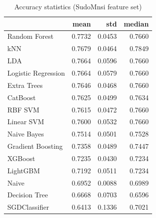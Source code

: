 \begin{table}
\caption{Accuracy statistics (SudoMnsi feature set)}
\label{tab:accuracy_SudoMnsi_stats}
\begin{tabular}{lrrr}
\toprule
 & mean & std & median \\
\midrule
Random Forest & 0.7732 & 0.0453 & 0.7660 \\
kNN & 0.7679 & 0.0464 & 0.7849 \\
LDA & 0.7664 & 0.0596 & 0.7660 \\
Logistic Regression & 0.7664 & 0.0579 & 0.7660 \\
Extra Trees & 0.7646 & 0.0468 & 0.7660 \\
CatBoost & 0.7625 & 0.0499 & 0.7634 \\
RBF SVM & 0.7615 & 0.0472 & 0.7660 \\
Linear SVM & 0.7600 & 0.0532 & 0.7660 \\
Naive Bayes & 0.7514 & 0.0501 & 0.7528 \\
Gradient Boosting & 0.7358 & 0.0489 & 0.7447 \\
XGBoost & 0.7235 & 0.0430 & 0.7234 \\
LightGBM & 0.7192 & 0.0511 & 0.7234 \\
Naive & 0.6952 & 0.0088 & 0.6989 \\
Decision Tree & 0.6668 & 0.0703 & 0.6596 \\
SGDClassifier & 0.6413 & 0.1336 & 0.7021 \\
\bottomrule
\end{tabular}
\end{table}
